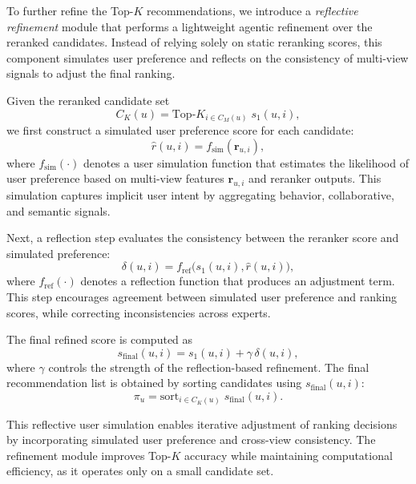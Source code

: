 \documentclass[sigconf,anonymous]{acmart}
\begin{document}
To further refine the Top-$K$ recommendations, we introduce a \textit{reflective refinement} module that performs a lightweight agentic refinement over the reranked candidates. Instead of relying solely on static reranking scores, this component simulates user preference and reflects on the consistency of multi-view signals to adjust the final ranking.

Given the reranked candidate set
\begin{equation}
C_K(u) = \text{Top-}K_{i \in C_M(u)} \; s_1(u,i),
\end{equation}
we first construct a simulated user preference score for each candidate:
\begin{equation}
\hat{r}(u,i) = f_{\text{sim}}(\mathbf{r}_{u,i}),
\end{equation}
where $f_{\text{sim}}(\cdot)$ denotes a user simulation function that estimates the likelihood of user preference based on multi-view features $\mathbf{r}_{u,i}$ and reranker outputs. This simulation captures implicit user intent by aggregating behavior, collaborative, and semantic signals.

Next, a reflection step evaluates the consistency between the reranker score and simulated preference:
\begin{equation}
\delta(u,i) = f_{\text{ref}}\big(s_1(u,i), \hat{r}(u,i)\big),
\end{equation}
where $f_{\text{ref}}(\cdot)$ denotes a reflection function that produces an adjustment term. This step encourages agreement between simulated user preference and ranking scores, while correcting inconsistencies across experts.

The final refined score is computed as
\begin{equation}
s_{\text{final}}(u,i)
=
s_1(u,i)
+
\gamma \, \delta(u,i),
\end{equation}
where $\gamma$ controls the strength of the reflection-based refinement. The final recommendation list is obtained by sorting candidates using $s_{\text{final}}(u,i)$:
\begin{equation}
\pi_u = \text{sort}_{i \in C_K(u)} \; s_{\text{final}}(u,i).
\end{equation}

This reflective user simulation enables iterative adjustment of ranking decisions by incorporating simulated user preference and cross-view consistency. The refinement module improves Top-$K$ accuracy while maintaining computational efficiency, as it operates only on a small candidate set.
\end{document}
